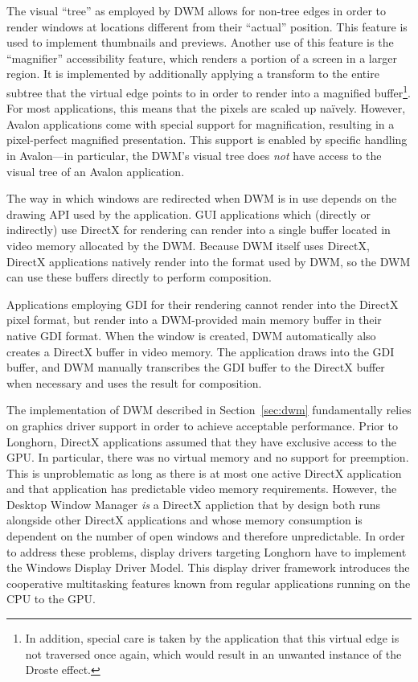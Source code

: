 			The visual \enquote{tree} as employed by DWM allows for non-tree edges
			in order to render windows at locations different from their \enquote{actual}
			position. This feature is used to implement thumbnails and previews.
			Another use of this feature is the \enquote{magnifier} accessibility
			feature, which renders a portion of a screen in a larger region.
			It is implemented by additionally applying a transform to the entire
			subtree that the virtual edge points to in order to render into a
			magnified buffer\footnote{In addition, special care is taken by the
			application
			that this virtual edge is not traversed once again, which would result
			in an unwanted instance of the Droste effect.}. %
			For most applications, this means that the pixels are scaled up naïvely.
			However, Avalon applications come with special support for magnification,
			resulting in a pixel-perfect magnified presentation. This support
			is enabled by specific handling in Avalon---in particular, the DWM's
			visual tree does \emph{not} have access to the visual tree of an
			Avalon application.
			\cite{goingdeep}

			The way in which windows are redirected when DWM is in use depends
			on the drawing API used by the application. GUI applications which
			(directly or indirectly)
			use DirectX for rendering can render into a single buffer located
			in video memory allocated
			by the DWM. Because DWM itself uses DirectX, DirectX applications
			natively render into the format used by DWM, so the DWM can use
			these buffers directly to perform composition.
			\cite{dwmredirect}

			Applications employing GDI for their rendering cannot render into
			the DirectX pixel format, but render into a DWM-provided main memory
			buffer in their native GDI format. When the window is created, DWM
			automatically also creates a DirectX buffer in video memory. The
			application draws into the GDI buffer, and DWM manually transcribes
			the GDI buffer to the DirectX buffer when necessary and uses the result
			for composition.
			\cite{dwmredirect}

		\label{sec:wddm}
			The implementation of DWM described in Section~\ref{sec:dwm}
			fundamentally relies on graphics driver support in order to achieve
			acceptable performance.  Prior to Longhorn, DirectX applications
			assumed that they have exclusive access to the GPU. In particular,
			there was no virtual memory and no support for preemption. This is
			unproblematic as long as there is at most one active DirectX application
			and that application has predictable video memory requirements.
			However, the Desktop Window Manager \emph{is} a DirectX appliction that
			by design both runs alongside other DirectX applications and whose
			memory consumption is dependent on the number of open windows and therefore
			unpredictable.
			In order to address these problems, display drivers targeting Longhorn
			have to implement the Windows Display Driver Model. This
			display driver framework introduces the cooperative multitasking
			features known from regular applications running on the CPU to the
			GPU. \cite{dwmwddm}

